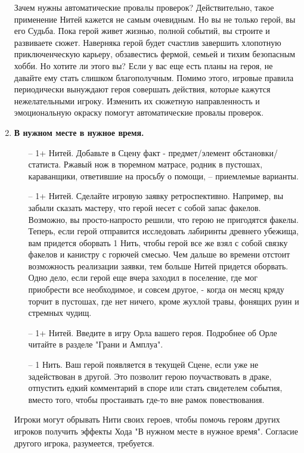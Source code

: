 \begin{enumerate}
    \begin{tcolorbox}
        Зачем нужны автоматические провалы проверок? Действительно, такое применение Нитей кажется не самым очевидным. Но вы не только герой, вы его Судьба. Пока герой живет жизнью, полной событий, вы строите и развиваете сюжет. Наверняка герой будет счастлив завершить хлопотную приключенческую карьеру, обзавестись фермой, семьей и тихим безопасным хобби. Но хотите ли этого вы? Если у вас еще есть планы на героя, не давайте ему стать слишком благополучным.
        \newline Помимо этого, игровые правила периодически вынуждают героя совершать действия, которые кажутся нежелательными игроку. Изменить их сюжетную направленность и эмоциональную окраску помогут автоматические провалы проверок.
    \end{tcolorbox}

    \item \textbf{В нужном месте в нужное время.}
    \begin{itemize}
        \item[--] 1+ Нитей. Добавьте в Сцену факт - предмет/элемент обстановки/статиста. Ржавый нож в тюремном матрасе, родник в пустошах, караванщики, ответившие на просьбу о помощи, – приемлемые варианты. 
        \item[--] 1+ Нитей. Сделайте игровую заявку ретроспективно. Например, вы забыли сказать мастеру, что герой несет с собой запас факелов. Возможно, вы просто-напросто решили, что герою не пригодятся факелы. Теперь, если герой отправится исследовать лабиринты древнего убежища, вам придется оборвать 1 Нить, чтобы герой все же взял с собой связку факелов и канистру с горючей смесью.
        \newline Чем дальше во времени отстоит возможность реализации заявки, тем больше Нитей придется оборвать. Одно дело, если герой еще вчера заходил в поселение, где мог приобрести все необходимое, и совсем другое, - когда он месяц кряду торчит в пустошах, где нет ничего, кроме жухлой травы, фонящих руин и стремных чудищ.
        \item[--] 1+ Нитей. Введите в игру Орла вашего героя. Подробнее об Орле читайте в разделе "Грани и Амплуа".
        \item[--] 1 Нить. Ваш герой появляется в текущей Сцене, если уже не задействован в другой. Это позволит герою поучаствовать в драке, отпустить едкий комментарий в споре или стать свидетелем события, вместо того, чтобы простаивать где-то вне рамок повествования.
    \end{itemize}
    \begin{tcolorbox}
        Игроки могут обрывать Нити своих героев, чтобы помочь героям других игроков получить эффекты Хода "В нужном месте в нужное время". Согласие другого игрока, разумеется, требуется.
    \end{tcolorbox}


\end{enumerate}
